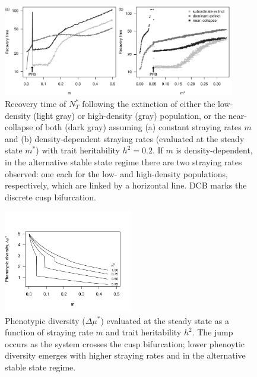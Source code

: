 \documentclass{revtex4}
\begin{document}
\begin{figure}
  \captionsetup{justification=raggedright,
singlelinecheck=false
}
\centering
\includegraphics[width=0.9\textwidth]{fig_relax_lowh.pdf}
\caption{
Recovery time of $N_T^*$ following the extinction of either the low-density (light gray) or high-density (gray) population, or the near-collapse of both (dark gray) assuming (a) constant straying rates $m$ and (b) density-dependent straying rates (evaluated at the steady state $m^*$) with trait heritability $h^2=0.2$.
If $m$ is density-dependent, in the alternative stable state regime there are two straying rates observed: one each for the low- and high-density populations, respectively, which are linked by a horizontal line.
DCB marks the discrete cusp bifurcation.
} \label{fig:relax}
\end{figure}


\begin{figure}
  \captionsetup{justification=raggedright,
singlelinecheck=false
}
\centering
\includegraphics[width=0.5\textwidth]{fig_traitdiff.pdf}
\caption{
Phenotypic diversity ($\Delta \mu^*$) evaluated at the steady state as a function of straying rate $m$ and trait heritability $h^2$. The jump occurs as the system crosses the cusp bifurcation; lower phenoytic diversity emerges with higher straying rates and in the alternative stable state regime. 
} \label{fig:traitdiff}
\end{figure}
\end{document}
